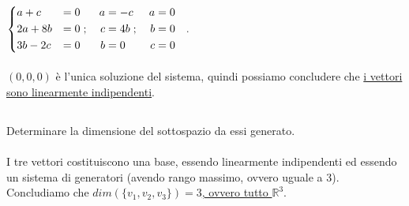 \documentclass[a4paper]{report}
\newenvironment{problem}
        {
                \begin{mdframed}[topline=false,rightline=false,bottomline=false]
                        \slshape
        }
        {
                \end{mdframed}
        }
\begin{document}
        \paragraph{}
        $
                \begin{dcases}
                        a + c   & = 0 \\
                        2a + 8b & = 0 \\
                        3b - 2c & = 0
                \end{dcases}; \quad \begin{aligned}
                        a & = -c \\
                        c & = 4b \\
                        b & = 0
                \end{aligned}; \quad \begin{aligned}
                        a & = 0 \\
                        b & = 0 \\
                        c & = 0
                \end{aligned} \quad .
        $

        \paragraph{}
        $(0,0,0)$ \`{e} l'unica soluzione del sistema, quindi possiamo concludere
        che \ul{i vettori sono linearmente indipendenti}.


        \subsection*{}
        \begin{problem}
                Determinare la dimensione del sottospazio da essi generato.
        \end{problem}

        \paragraph{}
        I tre vettori costituiscono una base, essendo linearmente indipendenti
        ed essendo un sistema di generatori (avendo rango massimo, ovvero uguale a 3).
        Concludiamo che \ul{$dim(\{v_1, v_2, v_3\}) = 3$, ovvero tutto $\mathbb{R}^3$}.


\end{document}
